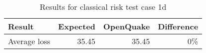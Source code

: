 \begin{table}[htbp]

\centering
\begin{tabular}{ l r r r }

\hline
\rowcolor{anti-flashwhite}
\bf{Result} & \bf{Expected} & \bf{OpenQuake} & \bf{Difference}\\
\hline
Average loss & 35.45 & 35.45 & 0\% \\
\hline
\end{tabular}

\caption{Results for classical risk test case 1d}
\label{tab:result-cr-1d}
\end{table}